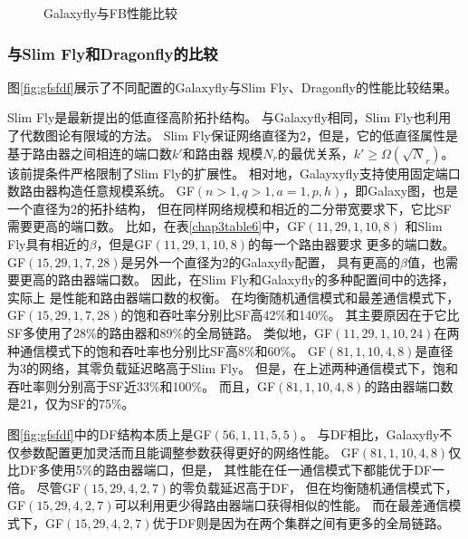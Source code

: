 \begin{figure}
  \centering
  \begin{minipage}[t]{\textwidth}
    \centering
    \caption{Galaxyfly与FB性能比较}
    \label{fig:gffb}
  \end{minipage}
\end{figure}

\subsubsection{与Slim Fly和Dragonfly的比较}
图\ref{fig:gfsfdf}展示了不同配置的Galaxyfly与Slim Fly、Dragonfly的性能比较结果。

Slim Fly是最新提出的低直径高阶拓扑结构。
与Galaxyfly相同，Slim Fly也利用了代数图论有限域的方法。
Slim Fly保证网络直径为2，但是，它的低直径属性是基于路由器之间相连的端口数$k'$和路由器
规模$N_r$的最优关系，$k'\geq\Omega(\sqrt N_r)$。
该前提条件严格限制了Slim Fly的扩展性。
相对地，Galayxyfly支持使用固定端口数路由器构造任意规模系统。
GF$(n>1,q>1,a=1,p,h)$，即Galaxy图，也是一个直径为2的拓扑结构，
但在同样网络规模和相近的二分带宽要求下，它比SF需要更高的端口数。
比如，在表\ref{chap3table6}中，GF$(11,29,1,10,8)$
和Slim Fly具有相近的$\beta$，但是GF$(11,29,1,10,8)$的每一个路由器要求
更多的端口数。
GF$(15,29,1,7,28)$是另外一个直径为2的Galaxyfly配置，
具有更高的$\beta$值，也需要更高的路由器端口数。
因此，在Slim Fly和Galaxyfly的多种配置间中的选择，实际上
是性能和路由器端口数的权衡。
在均衡随机通信模式和最差通信模式下，
GF$(15,29,1,7,28)$的饱和吞吐率分别比SF高42\%和140\%。
其主要原因在于它比SF多使用了28\%的路由器和89\%的全局链路。
类似地，GF$(11,29,1,10,24)$在两种通信模式下的饱和吞吐率也分别比SF高8\%和60\%。
GF$(81,1,10,4,8)$是直径为3的网络，其零负载延迟略高于Slim Fly。
但是，在上述两种通信模式下，饱和吞吐率则分别高于SF近33\%和100\%。
而且，GF$(81,1,10,4,8)$的路由器端口数是21，仅为SF的75\%。

图\ref{fig:gfsfdf}中的DF结构本质上是GF$(56,1,11,5,5)$。
与DF相比，Galaxyfly不仅参数配置更加灵活而且能调整参数获得更好的网络性能。
GF$(81,1,10,4,8)$仅比DF多使用5\%的路由器端口，但是，
其性能在任一通信模式下都能优于DF一倍。
尽管GF$(15,29,4,2,7)$的零负载延迟高于DF，
但在均衡随机通信模式下，GF$(15,29,4,2,7)$可以利用更少得路由器端口获得相似的性能。
而在最差通信模式下，GF$(15,29,4,2,7)$优于DF则是因为在两个集群之间有更多的全局链路。

